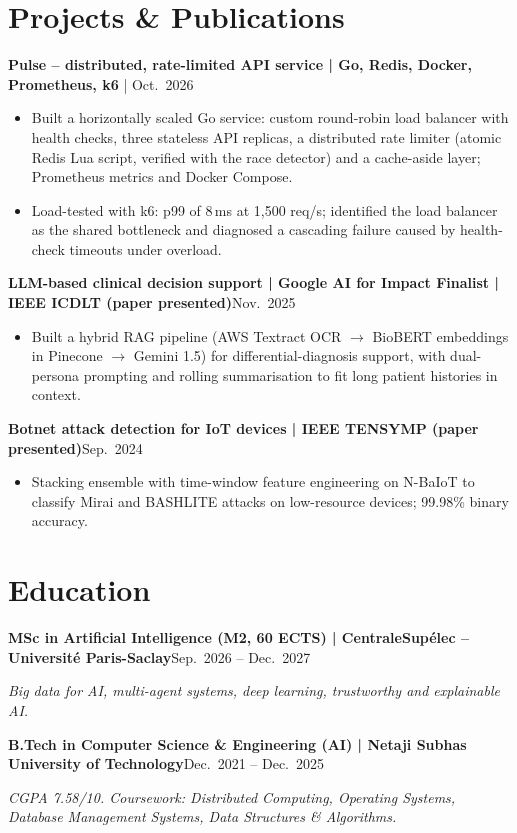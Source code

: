 \documentclass[10pt,a4paper]{article}
\newcommand{\entry}[2]{\textbf{#1}\hfill #2\par}
\newcommand{\note}[1]{{\small\textit{#1}}\par}
\begin{document}
\section{Projects \& Publications}
\entry{Pulse -- distributed, rate-limited API service \textnormal{| Go, Redis, Docker, Prometheus, k6}}
{\href{https://github.com/balv1nder/pulse}{\faGithub} \;|\; Oct.\ 2026}
\begin{itemize}
  \item Built a horizontally scaled Go service: custom round-robin load balancer with health checks, three stateless API replicas, a distributed rate limiter (atomic Redis Lua script, verified with the race detector) and a cache-aside layer; Prometheus metrics and Docker Compose.
  \item Load-tested with k6: p99 of 8\,ms at 1,500 req/s; identified the load balancer as the shared bottleneck and diagnosed a cascading failure caused by health-check timeouts under overload.
\end{itemize}
\entry{LLM-based clinical decision support\textnormal{ | Google AI for Impact Finalist | IEEE ICDLT (paper presented)}}{Nov.\ 2025}
\begin{itemize}
  \item Built a hybrid RAG pipeline (AWS Textract OCR $\rightarrow$ BioBERT embeddings in Pinecone $\rightarrow$ Gemini 1.5) for differential-diagnosis support, with dual-persona prompting and rolling summarisation to fit long patient histories in context.
\end{itemize}
\entry{Botnet attack detection for IoT devices \textnormal{| IEEE TENSYMP (paper presented)}}{Sep.\ 2024}
\begin{itemize}
  \item Stacking ensemble with time-window feature engineering on N-BaIoT to classify Mirai and BASHLITE attacks on low-resource devices; 99.98\% binary accuracy.
\end{itemize}

\section{Education}
\entry{MSc in Artificial Intelligence (M2, 60 ECTS) \textnormal{| CentraleSup\'elec -- Universit\'e Paris-Saclay}}{Sep.\ 2026 -- Dec.\ 2027}
\note{Big data for AI, multi-agent systems, deep learning, trustworthy and explainable AI.}
\entry{B.Tech in Computer Science \& Engineering (AI) \textnormal{| Netaji Subhas University of Technology}}{Dec.\ 2021 -- Dec.\ 2025}
\note{CGPA 7.58/10. Coursework: Distributed Computing, Operating Systems, Database Management Systems, Data Structures \& Algorithms.}
\end{document}
